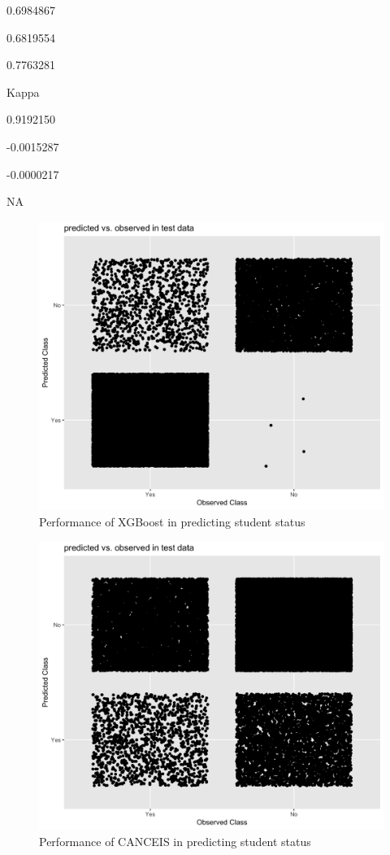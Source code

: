 \documentclass[]{book}
\begin{document}
0.6984867

0.6819554

0.7763281

Kappa

0.9192150

-0.0015287

-0.0000217

NA

\begin{figure}
\centering
\includegraphics{images/STXGBoostqplot.png}
\caption{Performance of XGBoost in predicting student status}
\end{figure}

\begin{figure}
\centering
\includegraphics{images/STCANCEISqplot.png}
\caption{Performance of CANCEIS in predicting student status}
\end{figure}
\end{document}
